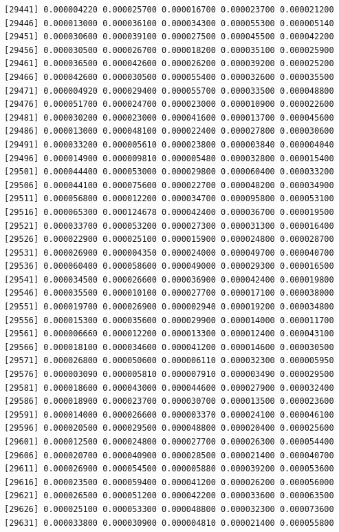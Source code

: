\documentclass[]{article}
\begin{document}
\begin{verbatim}
[29441] 0.000004220 0.000025700 0.000016700 0.000023700 0.000021200
[29446] 0.000013000 0.000036100 0.000034300 0.000055300 0.000005140
[29451] 0.000030600 0.000039100 0.000027500 0.000045500 0.000042200
[29456] 0.000030500 0.000026700 0.000018200 0.000035100 0.000025900
[29461] 0.000036500 0.000042600 0.000026200 0.000039200 0.000025200
[29466] 0.000042600 0.000030500 0.000055400 0.000032600 0.000035500
[29471] 0.000004920 0.000029400 0.000055700 0.000033500 0.000048800
[29476] 0.000051700 0.000024700 0.000023000 0.000010900 0.000022600
[29481] 0.000030200 0.000023000 0.000041600 0.000013700 0.000045600
[29486] 0.000013000 0.000048100 0.000022400 0.000027800 0.000030600
[29491] 0.000033200 0.000005610 0.000023800 0.000003840 0.000004040
[29496] 0.000014900 0.000009810 0.000005480 0.000032800 0.000015400
[29501] 0.000044400 0.000053000 0.000029800 0.000060400 0.000033200
[29506] 0.000044100 0.000075600 0.000022700 0.000048200 0.000034900
[29511] 0.000056800 0.000012200 0.000034700 0.000095800 0.000053100
[29516] 0.000065300 0.000124678 0.000042400 0.000036700 0.000019500
[29521] 0.000033700 0.000053200 0.000027300 0.000031300 0.000016400
[29526] 0.000022900 0.000025100 0.000015900 0.000024800 0.000028700
[29531] 0.000026900 0.000004350 0.000024000 0.000049700 0.000040700
[29536] 0.000060400 0.000058600 0.000049000 0.000029300 0.000016500
[29541] 0.000034500 0.000026600 0.000036900 0.000042400 0.000019800
[29546] 0.000035500 0.000010100 0.000027700 0.000017100 0.000038000
[29551] 0.000019700 0.000026900 0.000002940 0.000019200 0.000034800
[29556] 0.000015300 0.000035600 0.000029900 0.000014000 0.000011700
[29561] 0.000006660 0.000012200 0.000013300 0.000012400 0.000043100
[29566] 0.000018100 0.000034600 0.000041200 0.000014600 0.000030500
[29571] 0.000026800 0.000050600 0.000006110 0.000032300 0.000005950
[29576] 0.000003090 0.000005810 0.000007910 0.000003490 0.000029500
[29581] 0.000018600 0.000043000 0.000044600 0.000027900 0.000032400
[29586] 0.000018900 0.000023700 0.000030700 0.000013500 0.000023600
[29591] 0.000014000 0.000026600 0.000003370 0.000024100 0.000046100
[29596] 0.000020500 0.000029500 0.000048800 0.000020400 0.000025600
[29601] 0.000012500 0.000024800 0.000027700 0.000026300 0.000054400
[29606] 0.000020700 0.000040900 0.000028500 0.000021400 0.000040700
[29611] 0.000026900 0.000054500 0.000005880 0.000039200 0.000053600
[29616] 0.000023500 0.000059400 0.000041200 0.000026200 0.000056000
[29621] 0.000026500 0.000051200 0.000042200 0.000033600 0.000063500
[29626] 0.000025100 0.000053300 0.000048800 0.000032300 0.000073600
[29631] 0.000033800 0.000030900 0.000004810 0.000021400 0.000055800

\end{verbatim}
\end{document}
